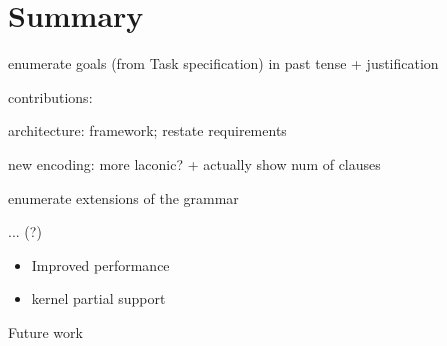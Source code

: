 \chapter{Summary}
\label{ch:summary}

enumerate goals (from Task specification) in past tense + justification

contributions:

  architecture:  framework; restate requirements

  new encoding: more laconic? + actually show num of clauses




  enumerate extensions of the grammar
  
  ... (?)
  
\begin{itemize}
\item Improved performance
\item kernel partial support
\end{itemize}


Future work